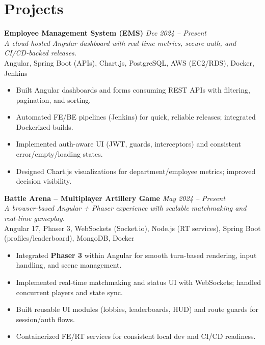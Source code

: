 \documentclass[10pt, letterpaper]{article}
\newenvironment{highlights}{\begin{itemize}[topsep=0.08 cm, parsep=0.06 cm, partopsep=0pt, itemsep=2pt, leftmargin=10pt]}{\end{itemize}}
\begin{document}
\section{Projects}

\textbf{Employee Management System (EMS)} \hfill \textit{Dec 2024 -- Present} \\
\textit{A cloud-hosted Angular dashboard with real-time metrics, secure auth, and CI/CD-backed releases.} \\
Angular, Spring Boot (APIs), Chart.js, PostgreSQL, AWS (EC2/RDS), Docker, Jenkins \\
\begin{highlights}
    \item Built Angular dashboards and forms consuming REST APIs with filtering, pagination, and sorting.
    \item Automated FE/BE pipelines (Jenkins) for quick, reliable releases; integrated Dockerized builds.
    \item Implemented auth-aware UI (JWT, guards, interceptors) and consistent error/empty/loading states.
    \item Designed Chart.js visualizations for department/employee metrics; improved decision visibility.
\end{highlights}
\vspace{0.3cm}

\textbf{Battle Arena – Multiplayer Artillery Game} \hfill \textit{May 2024 -- Present} \\
\textit{A browser-based Angular + Phaser experience with scalable matchmaking and real-time gameplay.} \\
Angular 17, Phaser 3, WebSockets (Socket.io), Node.js (RT services), Spring Boot (profiles/leaderboard), MongoDB, Docker \\
\begin{highlights}
    \item Integrated \textbf{Phaser 3} within Angular for smooth turn-based rendering, input handling, and scene management.
    \item Implemented real-time matchmaking and status UI with WebSockets; handled concurrent players and state sync.
    \item Built reusable UI modules (lobbies, leaderboards, HUD) and route guards for session/auth flows.
    \item Containerized FE/RT services for consistent local dev and CI/CD readiness.
\end{highlights}
\vspace{0.3cm}
\end{document}
